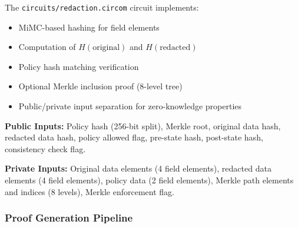 The \texttt{circuits/redaction.circom} circuit implements:
\begin{itemize}
    \item MiMC-based hashing for field elements
    \item Computation of $H(\text{original})$ and $H(\text{redacted})$
    \item Policy hash matching verification
    \item Optional Merkle inclusion proof (8-level tree)
    \item Public/private input separation for zero-knowledge properties
\end{itemize}

\textbf{Public Inputs:} Policy hash (256-bit split), Merkle root, original data hash, redacted data hash, policy allowed flag, pre-state hash, post-state hash, consistency check flag.

\textbf{Private Inputs:} Original data elements (4 field elements), redacted data elements (4 field elements), policy data (2 field elements), Merkle path elements and indices (8 levels), Merkle enforcement flag.

\subsubsection{Proof Generation Pipeline}

